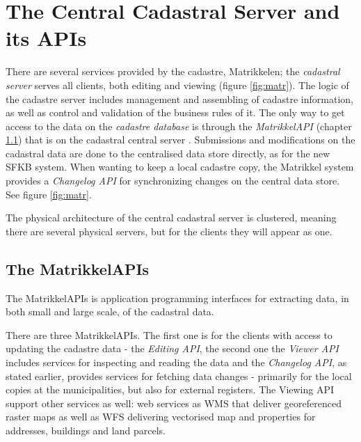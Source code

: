 \section{The Central Cadastral Server and its APIs}
There are several services provided by the cadastre, Matrikkelen; the \textit{cadastral server} serves all clients, both editing and viewing (figure \ref{fig:matr}). The logic of the cadastre server includes management and assembling of cadastre information, as well as control and validation of the business rules of it. The only way to get access to the data on the \textit{cadastre database} is through the \textit{MatrikkelAPI} (chapter \ref{matrikkelapi}) that is on the cadastral central server \citep[p.~338]{Matrikkelavdelingen2017}. Submissions and modifications on the cadastral data are done to the centralised data store directly, as for the new SFKB system. When wanting to keep a local cadastre copy, the Matrikkel system provides a \textit{Changelog API} for synchronizing changes on the central data store. See figure \ref{fig:matr}. 

The physical architecture of the central cadastral server is clustered, meaning there are several physical servers, but for the clients they will appear as one. %


\subsection{The MatrikkelAPIs} \label{matrikkelapi}
The MatrikkelAPIs is application programming interfaces for extracting data, in both small and large scale, of the cadastral data.  

There are three MatrikkelAPIs. The first one is for the clients with access to updating the cadastre data - the \textit{Editing API}, the second one the \textit{Viewer API} includes services for inspecting and reading the data and the \textit{Changelog API}, as stated earlier, provides services for fetching data changes - primarily for the local copies at the municipalities, but also for external registers.  The Viewing API support other services as well: web services as WMS that deliver georeferenced raster maps
as well as WFS delivering vectorised map	and properties for addresses, buildings and land parcels. 


